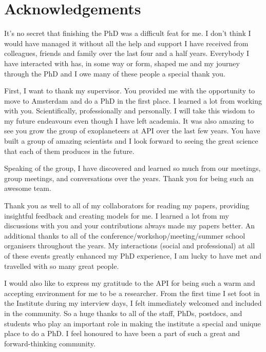 
\setcounter{footnote}{0}


\chapter{Acknowledgements}


\vspace{10mm}

It’s no secret that finishing the PhD was a difficult feat for me. I don’t think I would have managed it without all the help and support I have received from colleagues, friends and family over the last four and a half years. Everybody I have interacted with has, in some way or form, shaped me and my journey through the PhD and I owe many of these people a special thank you.

First, I want to thank my supervisor. You provided me with the opportunity to move to Amsterdam and do a PhD in the first place. I learned a lot from working with you. Scientifically, professionally and personally. I will take this wisdom to my future endeavours even though I have left academia. It was also amazing to see you grow the group of exoplaneteers at API over the last few years. You have built a group of amazing scientists and I look forward to seeing the great science that each of them produces in the future.

Speaking of the group, I have discovered and learned so much from our meetings, group meetings, and conversations over the years. Thank you for being such an awesome team.

Thank you as well to all of my collaborators for reading my papers, providing insightful feedback and creating models for me. I learned a lot from my discussions with you and your contributions always made my papers better. An additional thanks to all of the conference/workshop/meeting/summer school organisers throughout the years. My interactions (social and professional) at all of these events greatly enhanced my PhD experience, I am lucky to have met and travelled with so many great people.

I would also like to express my gratitude to the API for being such a warm and accepting environment for me to be a researcher. From the first time I set foot in the Institute during my interview days, I felt immediately welcomed and included in the community. So a huge thanks to all of the staff, PhDs, postdocs, and students who play an important role in making the institute a special and unique place to do a PhD. I feel honoured to have been a part of such a great and forward-thinking community.

